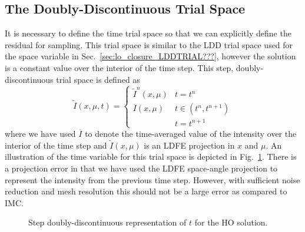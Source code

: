 \subsection{The Doubly-Discontinuous Trial Space}

It is necessary to define the time trial space so that we can explicitly define the
residual for sampling.  This trial space is similar to the LDD trial space used for the space variable
in Sec.~\ref{sec:lo_closure_LDDTRIAL???}, however the solution is a constant value over
the interior of the time step. This step, doubly-discontinuous trial space is defined as
\begin{equation}\label{eq:time_space}
    \tilde I(x,\mu,t) = \left \{ \begin{matrix} 
        \tilde I^{n}(x,\mu)  & t = t^n \\ 
        \overline I(x,\mu)  & t \in (t^{n},t^{n+1}) \\               
        & t = t^{n+1}
             \end{matrix}           \right.
\end{equation}
where we have used $\overline I$ to denote the time-averaged value of the intensity over
the interior of the time step and $\tilde I(x,\mu)$ is an LDFE projection in $x$ and
$\mu$.  An illustration of the time variable for this trial space
is depicted in Fig.~\ref{fig:dd_time}.    There is a projection error in that we have used the LDFE space-angle
projection to represent the intensity from the previous time step.  However, with
sufficient noise reduction and mesh resolution this should not be a large error as
compared to IMC.
\begin{figure}[H]
    \centering
    \begin{center}
    \end{center}
    \caption{Step doubly-discontinuous representation of $t$ for the HO solution.}
    \label{fig:dd_time}
\end{figure}


